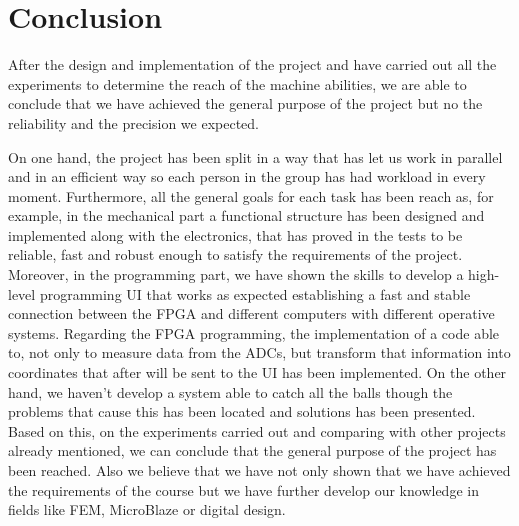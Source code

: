 \chapter{Conclusion}
\label{chap:conclusion}

	After the design and implementation of the project and have carried out all the experiments to determine the reach of the machine abilities, we are able to conclude that we have achieved the general purpose of the project but no the reliability and the precision we expected.

	On one hand, the project has been split in a way that has let us work in parallel and in an efficient way so each person in the group has had workload in every moment.
	Furthermore, all the general goals for each task has been reach as, for example, in the mechanical part a functional structure has been designed and implemented along with the electronics, that has proved in the tests to be reliable, fast and robust enough to satisfy the requirements of the project.
	Moreover, in the programming part, we have shown the skills to develop a high-level programming UI that works as expected establishing a fast and stable connection between the FPGA and different computers with different operative systems.
	Regarding the FPGA programming, the implementation of a code able to, not only to measure data from the ADCs, but transform that information into coordinates that after will be sent to the UI has been implemented.
	On the other hand, we haven't develop a system able to catch all the balls though the problems that cause this has been located and solutions has been presented.
	Based on this, on the experiments carried out and comparing with other projects already mentioned, we can conclude that the general purpose of the project has been reached.
	Also we believe that we have not only shown that we have  achieved the requirements of the course but we have further develop our knowledge in fields like FEM, MicroBlaze or digital design.

